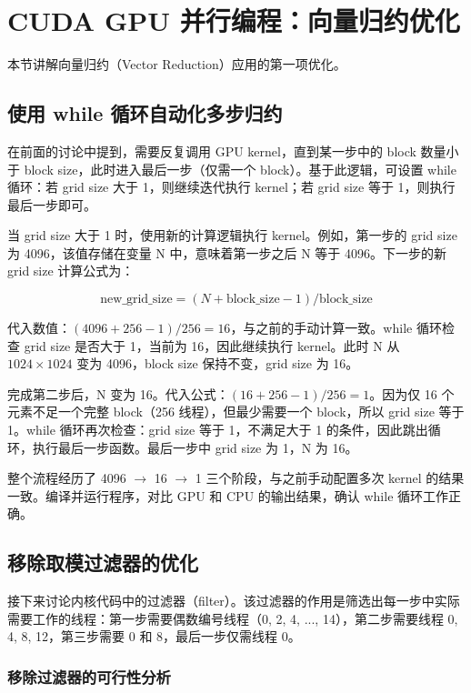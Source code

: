 \section{CUDA GPU 并行编程：向量归约优化}

本节讲解向量归约（Vector Reduction）应用的第一项优化。

\subsection{使用 while 循环自动化多步归约}

在前面的讨论中提到，需要反复调用 GPU kernel，直到某一步中的 block 数量小于 block size，此时进入最后一步（仅需一个 block）。基于此逻辑，可设置 while 循环：若 grid size 大于 1，则继续迭代执行 kernel；若 grid size 等于 1，则执行最后一步即可。

当 grid size 大于 1 时，使用新的计算逻辑执行 kernel。例如，第一步的 grid size 为 4096，该值存储在变量 N 中，意味着第一步之后 N 等于 4096。下一步的新 grid size 计算公式为：

\[
\text{new\_grid\_size} = (N + \text{block\_size} - 1) / \text{block\_size}
\]

代入数值：$(4096 + 256 - 1) / 256 = 16$，与之前的手动计算一致。while 循环检查 grid size 是否大于 1，当前为 16，因此继续执行 kernel。此时 N 从 $1024 \times 1024$ 变为 4096，block size 保持不变，grid size 为 16。

完成第二步后，N 变为 16。代入公式：$(16 + 256 - 1) / 256 = 1$。因为仅 16 个元素不足一个完整 block（256 线程），但最少需要一个 block，所以 grid size 等于 1。while 循环再次检查：grid size 等于 1，不满足大于 1 的条件，因此跳出循环，执行最后一步函数。最后一步中 grid size 为 1，N 为 16。

整个流程经历了 4096 $\to$ 16 $\to$ 1 三个阶段，与之前手动配置多次 kernel 的结果一致。编译并运行程序，对比 GPU 和 CPU 的输出结果，确认 while 循环工作正确。

\subsection{移除取模过滤器的优化}

接下来讨论内核代码中的过滤器（filter）。该过滤器的作用是筛选出每一步中实际需要工作的线程：第一步需要偶数编号线程（0, 2, 4, ..., 14），第二步需要线程 0, 4, 8, 12，第三步需要 0 和 8，最后一步仅需线程 0。

\subsubsection{移除过滤器的可行性分析}


